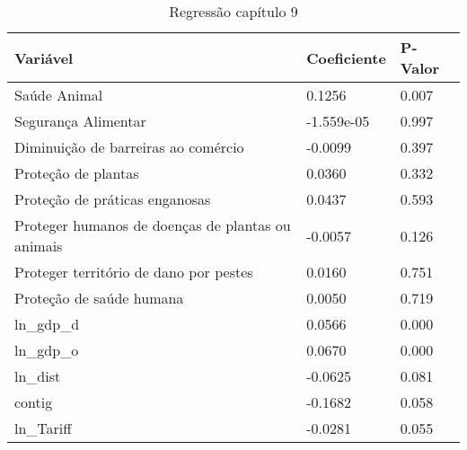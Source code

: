 \begin{table}[h]
    \begin{tabular}{@{}l|l|l@{}}
    \toprule
    Variável                                          & Coeficiente & P-Valor \\ \midrule
    Saúde Animal                                      & 0.1256      & 0.007   \\ \midrule
    Segurança Alimentar                               & -1.559e-05  & 0.997   \\ \midrule
    Diminuição de barreiras ao comércio               & -0.0099     & 0.397   \\ \midrule
    Proteção de plantas                               & 0.0360      & 0.332   \\ \midrule
    Proteção de práticas enganosas                    & 0.0437      & 0.593   \\ \midrule
    Proteger humanos de doenças de plantas ou animais & -0.0057     & 0.126   \\ \midrule
    Proteger território de dano por pestes            & 0.0160      & 0.751   \\ \midrule
    Proteção de saúde humana                          & 0.0050      & 0.719   \\ \midrule
    ln\_gdp\_d                                        & 0.0566      & 0.000   \\ \midrule
    ln\_gdp\_o                                        & 0.0670      & 0.000   \\ \midrule
    ln\_dist                                          & -0.0625     & 0.081   \\ \midrule
    contig                                            & -0.1682     & 0.058   \\ \midrule
    ln\_Tariff                                        & -0.0281     & 0.055   \\ \bottomrule
    \end{tabular}
    \caption{Regressão capítulo 9}
    \end{table}